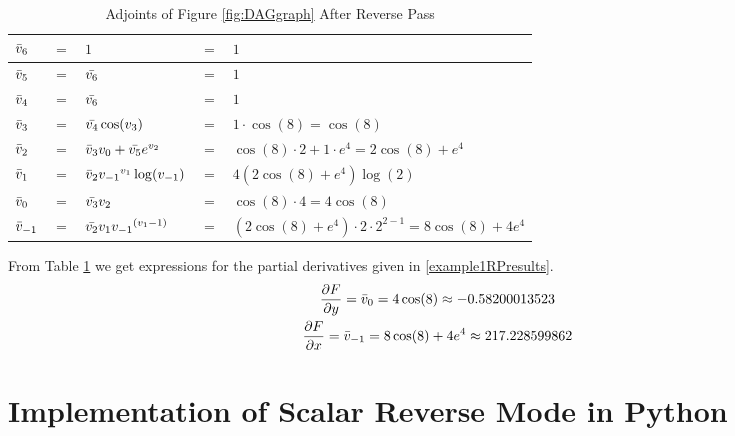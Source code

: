 \documentclass{article}
\begin{document}
\begin{table}[h!]
    \centering
    \begin{tabular}{|lclll|}
        \hline
        $\Bar{v}_{6}$ & $=$ & $1$ & $=$ & $1$ \\
        \hline
        $\Bar{v}_{5}$ & $=$ & $\Bar{v_6}$ & $=$ & $1$\\
        $\Bar{v}_{4}$ & $=$ & $\Bar{v_6}$ & $=$ & $1$\\
        $\Bar{v}_{3}$ & $=$ & $\Bar{v_4}\cos(v_3)$ & $=$ & $1 \cdot \cos(8) = \cos(8)$ \\
        $\Bar{v}_{2}$ & $=$ & $\Bar{v}_{3}v_0 + \Bar{v_5}e^{v_2}$ & $=$ & $\cos(8) \cdot 2 + 1 \cdot e^{4} = 2\cos(8)+e^4$ \\
        $\Bar{v}_{1}$ & $=$ & $\Bar{v}_{2}{v_{-1}}^{v_{1}}\log(v_{-1})$ & $=$ & $4(2\cos(8)+e^4)\log(2)$ \\
        \hline
        $\Bar{v}_{0}$ & $=$ & $\Bar{v_3}v_2$ & $=$ & $\cos(8)\cdot4 = 4\cos(8)$ \\
        $\Bar{v}_{-1}$ & $=$ & $\Bar{v_2}v_1 {v_{-1}}^{(v_{1}-1)}$ & $=$ & $(2\cos(8)+e^4) \cdot 2 \cdot 2^{2-1} = 8\cos(8)+4e^4$ \\
        \hline   
    \end{tabular}
    \caption{Adjoints of Figure \ref{fig:DAGgraph} After Reverse Pass}
    \label{tab:example1RP}
\end{table}
From Table \ref{tab:example1RP} we get expressions for the partial derivatives given in \eqref{example1RPresults}.
\begin{equation} \label{example1RPresults}
    \begin{gathered}
    \frac{\partial F}{\partial y} = \Bar{v}_0 =  4\cos(8) \approx -0.58200013523 \\
    \frac{\partial F}{\partial x} = \Bar{v}_{-1} = 8\cos(8) + 4e^4 \approx 217.228599862
    \end{gathered}
\end{equation}


\section{Implementation of Scalar Reverse Mode in Python}
\end{document}

